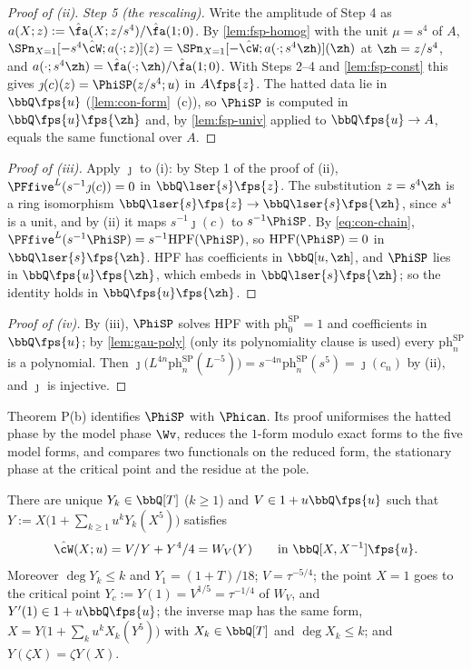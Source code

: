 \begin{proof}[Proof of (ii)]
\emph{Step 5 (the rescaling).} Write the amplitude of Step 4 as $a(X;z):=\hat\fa(X;z/s^4)/\hat\fa(1;0)$. By \cref{lem:fsp-homog} with the unit $\mu=s^4$ of $A$, $\SPn_{X=1}[-s^4\hat\cW;a(\cdot;z)](z)=\SPn_{X=1}[-\hat\cW;a(\cdot;s^4\zh)](\zh)$ at $\zh=z/s^4$, and $a(\cdot;s^4\zh)=\hat\fa(\cdot;\zh)/\hat\fa(1;0)$. With Steps 2--4 and \cref{lem:fsp-const} this gives $\jmath(c)(z)=\PhiSP(z/s^4;u)$ in $A\fps{z}$. The hatted data lie in $\bbQ\fps{u}$ (\cref{lem:con-form}~(c)), so $\PhiSP$ is computed in $\bbQ\fps{u}\fps{\zh}$ and, by \cref{lem:fsp-univ} applied to $\bbQ\fps{u}\to A$, equals the same functional over $A$.
\end{proof}

\begin{proof}[Proof of (iii)]
Apply $\jmath$ to (i): by Step 1 of the proof of (ii), $\PFfive^{L}(s^{-1}\jmath(c))=0$ in $\bbQ\lser{s}\fps{z}$. The substitution $z=s^4\zh$ is a ring isomorphism $\bbQ\lser{s}\fps{z}\to\bbQ\lser{s}\fps{\zh}$, since $s^4$ is a unit, and by (ii) it maps $s^{-1}\jmath(c)$ to $s^{-1}\PhiSP$. By \eqref{eq:con-chain}, $\PFfive^{L}(s^{-1}\PhiSP)=s^{-1}\mathrm{HPF}(\PhiSP)$, so $\mathrm{HPF}(\PhiSP)=0$ in $\bbQ\lser{s}\fps{\zh}$. HPF has coefficients in $\bbQ[u,\zh]$, and $\PhiSP$ lies in $\bbQ\fps{u}\fps{\zh}$, which embeds in $\bbQ\lser{s}\fps{\zh}$; so the identity holds in $\bbQ\fps{u}\fps{\zh}$.
\end{proof}

\begin{proof}[Proof of (iv)]
By (iii), $\PhiSP$ solves HPF with $\mathrm{ph}^{\mathrm{SP}}_0=1$ and coefficients in $\bbQ\fps{u}$; by \cref{lem:gau-poly} (only its polynomiality clause is used) every $\mathrm{ph}^{\mathrm{SP}}_n$ is a polynomial. Then $\jmath\bigl(L^{4n}\mathrm{ph}^{\mathrm{SP}}_n(L^{-5})\bigr)=s^{-4n}\mathrm{ph}^{\mathrm{SP}}_n(s^5)=\jmath(c_n)$ by (ii), and $\jmath$ is injective.
\end{proof}

Theorem P(b) identifies $\PhiSP$ with $\Phican$. Its proof uniformises the hatted phase by the model phase $\Wv$, reduces the $1$-form modulo exact forms to the five model forms, and compares two functionals on the reduced form, the stationary phase at the critical point and the residue at the pole.

\begin{lem}
\label{lem:con-cfu}
There are unique $Y_k\in\bbQ[T]$ ($k\geq1$) and $V\in1+u\bbQ\fps{u}$ such that $Y:=X\bigl(1+\sum_{k\geq1}u^kY_k(X^5)\bigr)$ satisfies
\[
\hat\cW(X;u)=V/Y+Y^4/4=W_V(Y)\qquad\text{in }\bbQ[X,X^{-1}]\fps{u}.
\]
Moreover $\deg Y_k\leq k$ and $Y_1=(1+T)/18$; $V=\tau^{-5/4}$; the point $X=1$ goes to the critical point $Y_c:=Y(1)=V^{1/5}=\tau^{-1/4}$ of $W_V$, and $Y'(1)\in1+u\bbQ\fps{u}$; the inverse map has the same form, $X=Y\bigl(1+\sum_ku^kX_k(Y^5)\bigr)$ with $X_k\in\bbQ[T]$ and $\deg X_k\leq k$; and $Y(\zeta X)=\zeta Y(X)$.
\end{lem}

